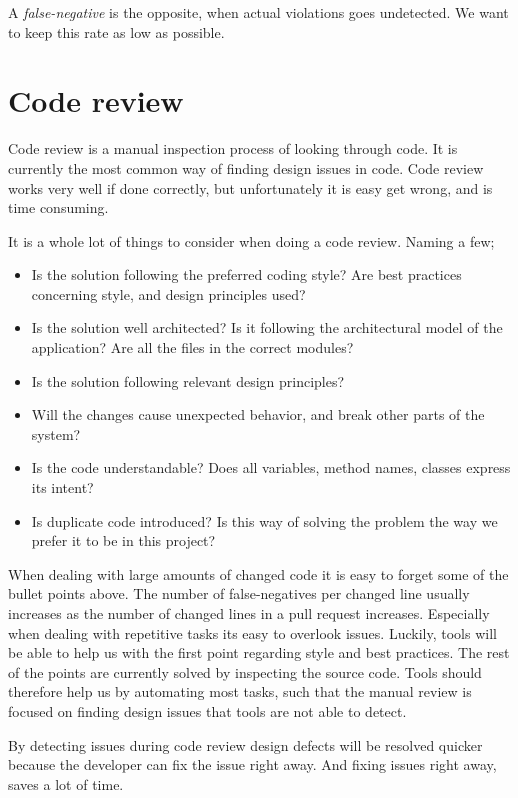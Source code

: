 \documentclass{report}
\begin{document}
A \textit{false-negative} is the opposite, when actual violations goes undetected. We want to keep this rate as low as possible. 

\section{Code review}
\label{code-review}
Code review is a manual inspection process of looking through code. It is currently the most common way of finding design issues in code. Code review works very well if done correctly, but unfortunately it is easy get wrong, and is time consuming. 

It is a whole lot of things to consider when doing a code review. Naming a few;

\begin{itemize}
    \item Is the solution following the preferred coding style? Are best practices concerning style, and design principles used?
    \item Is the solution well architected? Is it following the architectural model of the application? Are all the files in the correct modules?
    \item Is the solution following relevant design principles?
    \item Will the changes cause unexpected behavior, and break other parts of the system? 
    \item Is the code understandable? Does all variables, method names, classes express its intent?
    \item Is duplicate code introduced? Is this way of solving the problem the way we prefer it to be in this project?
\end{itemize}

When dealing with large amounts of changed code it is easy to forget some of the bullet points above. The number of false-negatives per changed line usually increases as the number of changed lines in a pull request increases. Especially when dealing with repetitive tasks its easy to overlook issues. Luckily, tools will be able to help us with the first point regarding style and best practices. The rest of the points are currently solved by inspecting the source code. Tools should therefore help us by automating most tasks, such that the manual review is focused on finding design issues that tools are not able to detect. 

By detecting issues during code review design defects will be resolved quicker because the developer can fix the issue right away. And fixing issues right away, saves a lot of time.
\end{document}
